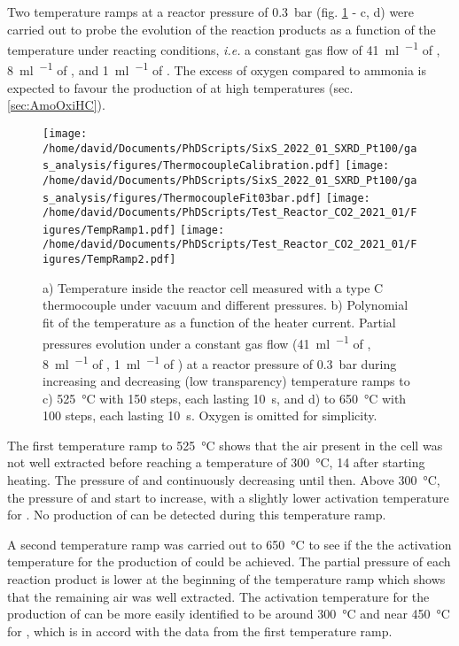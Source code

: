Two temperature ramps at a reactor pressure of \qty{0.3}{\bar} (fig. \ref{fig:TempRamps} - c, d) were carried out to probe the evolution of the reaction products as a function of the temperature under reacting conditions, \textit{i.e.} a constant gas flow of \qty{41}{\ml\per\min} of \argon, \qty{8}{\ml\per\min} of \dioxygen, and \qty{1}{\ml\per\min} of \ammonia.
The excess of oxygen compared to ammonia is expected to favour the production of \nitricoxide at high temperatures (sec. \ref{sec:AmoOxiHC}).

\begin{figure}[!htb]
    \centering
    \texttt{[image: /home/david/Documents/PhDScripts/SixS\_2022\_01\_SXRD\_Pt100/gas\_analysis/figures/ThermocoupleCalibration.pdf]}
    \texttt{[image: /home/david/Documents/PhDScripts/SixS\_2022\_01\_SXRD\_Pt100/gas\_analysis/figures/ThermocoupleFit03bar.pdf]}
    \texttt{[image: /home/david/Documents/PhDScripts/Test\_Reactor\_CO2\_2021\_01/Figures/TempRamp1.pdf]}
    \texttt{[image: /home/david/Documents/PhDScripts/Test\_Reactor\_CO2\_2021\_01/Figures/TempRamp2.pdf]}
    \caption{
        a) Temperature inside the reactor cell measured with a type C thermocouple under vacuum and different \argon pressures.
        b) Polynomial fit of the temperature as a function of the heater current.
        Partial pressures evolution under a constant gas flow (\qty{41}{\ml\per\min} of \argon, \qty{8}{\ml\per\min} of \dioxygen, \qty{1}{\ml\per\min} of \ammonia) at a reactor pressure of \qty{0.3}{\bar} during increasing and decreasing (low transparency) temperature ramps to c) \qty{525}{\degreeCelsius} with 150 steps, each lasting \qty{10}{\second}, and d) to \qty{650}{\degreeCelsius} with 100 steps, each lasting \qty{10}{\second}.
        Oxygen is omitted for simplicity.
    }
    \label{fig:TempRamps}
\end{figure}

The first temperature ramp to \qty{525}{\degreeCelsius} shows that the air present in the cell was not well extracted before reaching a temperature of \qty{300}{\degreeCelsius}, \qty{14}{\min} after starting heating.
The pressure of \nitrogen and \water continuously decreasing until then.
Above \qty{300}{\degreeCelsius}, the pressure of \nitrogen and \nitricoxide start to increase, with a slightly lower activation temperature for \nitrogen.
No production of \nitrousoxide can be detected during this temperature ramp.

A second temperature ramp was carried out to \qty{650}{\degreeCelsius} to see if the the activation temperature for the production of \nitrousoxide could be achieved.
The partial pressure of each reaction product is lower at the beginning of the temperature ramp which shows that the remaining air was well extracted.
The activation temperature for the production of \nitrogen can be more easily identified to be around \qty{300}{\degreeCelsius} and near \qty{450}{\degreeCelsius} for \nitricoxide, which is in accord with the data from the first temperature ramp.

